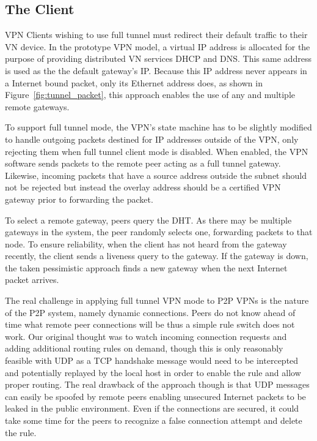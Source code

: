 \subsection{The Client}
VPN Clients wishing to use full tunnel must redirect their default traffic to
their VN device.  In the prototype VPN model, a virtual IP address is allocated
for the purpose of providing distributed VN services DHCP and DNS.  This same
address is used as the the default gateway's IP.  Because this IP address never
appears in a Internet bound packet, only its Ethernet address does, as shown in
Figure~\ref{fig:tunnel_packet}, this approach enables the use of any and
multiple remote gateways.

To support full tunnel mode, the VPN's state machine has to be slightly modified
to handle outgoing packets destined for IP addresses outside of the VPN, only
rejecting them when full tunnel client mode is disabled.  When enabled, the VPN
software sends packets to the remote peer acting as a full tunnel gateway.
Likewise, incoming packets that have a source address outside the subnet should
not be rejected but instead the overlay address should be a certified VPN
gateway prior to forwarding the packet.

To select a remote gateway, peers query the DHT.  As there may be multiple
gateways in the system, the peer randomly selects one, forwarding packets to
that node.  To ensure reliability, when the client has not heard from the
gateway recently, the client sends a liveness query to the gateway.  If the
gateway is down, the taken pessimistic approach finds a new gateway when
the next Internet packet arrives.

The real challenge in applying full tunnel VPN mode to P2P VPNs is the nature
of the P2P system, namely dynamic connections.  Peers do not know ahead of time
what remote peer connections will be thus a simple rule switch does not work.
Our original thought was to watch incoming connection requests and adding
additional routing rules on demand, though this is only reasonably feasible
with UDP as a TCP handshake message would need to be intercepted and potentially
replayed by the local host in order to enable the rule and allow proper routing.
The real drawback of the approach though is that UDP messages can easily be
spoofed by remote peers enabling unsecured Internet packets to be leaked in the
public environment.  Even if the connections are secured, it could take some
time for the peers to recognize a false connection attempt and delete the rule.

